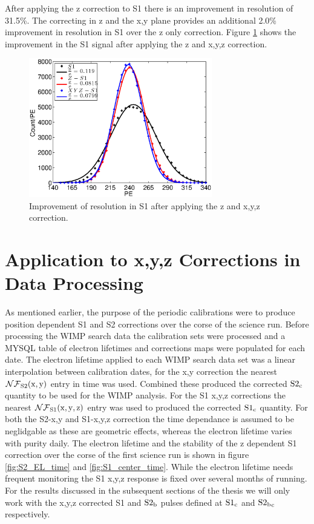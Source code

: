 After applying the z correction to S1 there is an improvement in resolution of 31.5\%. The correcting in z and the x,y plane provides an additional 2.0\% improvement in resolution in S1 over the z only correction. Figure \ref{fig:S1_res} shows the improvement in the S1 signal after applying the z and x,y,z correction.

\begin{figure}[h!]\centering
\includegraphics[width=80mm]{Chapter_XYZ_Corr/Thesis_Corr_Plots/S1_corr_res.eps}
\caption{Improvement of resolution in S1 after applying the z and x,y,z correction. }
\label{fig:S1_res}
\end{figure}


\section{Application to x,y,z Corrections in Data Processing}

As mentioned earlier, the purpose of the periodic \KrCal calibrations were to produce position dependent S1 and S2 corrections over the corse of the science run. Before processing the WIMP search data the calibration sets were processed and a MYSQL table of electron lifetimes and corrections maps were populated for each date. The electron lifetime applied to each WIMP search data set was a linear interpolation between calibration dates, for the x,y correction the nearest $\rm \mathcal{NF}_{S2}(x,y)$ entry in time was used. Combined these produced the corrected $\rm S2_c$ quantity to be used for the WIMP analysis. For the S1 x,y,z corrections the nearest $\rm \mathcal{NF}_{S1}(x,y,z)$ entry was used to produced the corrected $\rm S1_c$ quantity. For both the S2-x,y and S1-x,y,z correction the time dependance is assumed to be neglidgable as these are geometric effects, whereas the electron lifetime varies with purity daily.
The electron lifetime and the stability of the z dependent S1 correction over the corse of the first science run is shown in figure \ref{fig:S2_EL_time} and \ref{fig:S1_center_time}. While the electron lifetime needs frequent monitoring the S1 x,y,z response is fixed over several months of running.
For the results discussed in the subsequent sections of the thesis we will only work with the x,y,z corrected S1 and $\rm S2_b$ pulses defined at $\rm S1_c$ and $\rm S2{_b}_c$ respectively.

